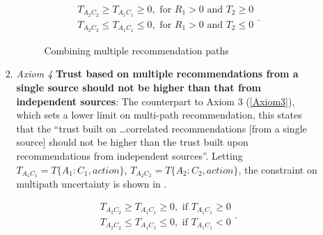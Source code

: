 \begin{itemize}
\begin{enumerate}
\begin{enumerate}
            \begin{equation}
              \begin{array}{l}
                T_{A_2C_2} \geq T_{A_1C_1} \geq 0, \mbox{ for } R_1 > 0 \mbox{ and
                } T_{2} \geq 0 \\
                T_{A_2C_2} \leq T_{A_1C_1} \leq 0, \mbox{ for } R_1 > 0 \mbox{ and
                } T_{2} \leq 0
              \end{array}
              \label{liu2006_multipath_concatenation-equ}.
            \end{equation}
            \begin{figure}[H!]
              \caption{Combining  multiple recommendation paths}
              \label{liu2006_multipath_concatenation-dots}
            \end{figure}
          \item \label{Axiom4} \emph{Axiom 4} \textbf{Trust based on multiple
            recommendations from a single source should not be higher than that
            from independent sources}: The counterpart to Axiom 3 (\ref{Axiom3}), which
            sets a lower limit on multi-path recommendation, this states that
            the ``trust built on \ldots correlated recommendations [from a
            single source] should not be higher than the trust built upon
            recommendations from independent sources''.
            Letting \(T_{A_1C_1}=T\{A_1 : C_1, action\}\), \(T_{A_2C_2}=T\{A_2:C_2,
            action\} \), the constraint on multipath uncertainty is shown in
            .

            \begin{equation}
              \begin{array}{l}
                T_{A_2C_2} \geq T_{A_1C_1} \geq 0, \mbox{ if } T_{A_1C_1} \geq 0 \\
                T_{A_2C_2} \leq T_{A_1C_1} \leq 0, \mbox{ if } T_{A_1C_1} < 0
              \end{array}
              \label{liu2006_multipath_propagation-equ}.
            \end{equation}


\end{enumerate}
\end{enumerate}
\end{itemize}
